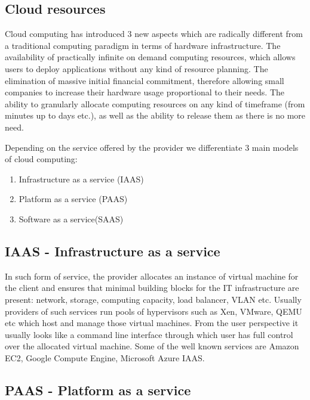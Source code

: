 \documentclass[licencjacka,en]{thesisclass}
\begin{document}
        \subsection{Cloud resources}

        Cloud computing has introduced 3 new aspects which are radically different from a traditional
        computing paradigm in terms of hardware infrastructure. 
        The availability of practically infinite on demand computing resources,
        which allows users to deploy applications without any kind of resource planning.  
        The elimination of massive initial financial commitment, therefore allowing small companies to increase
        their hardware usage proportional to their needs.
        The ability to granularly allocate computing resources on any kind of timeframe
        (from minutes up to days etc.), as well as the ability to release them as there is no more need.

        Depending on the service offered by the provider we differentiate 3 main models of cloud computing:

        \begin{enumerate}
            \item Infrastructure as a service (IAAS)
            \item Platform as a service (PAAS)
            \item Software as a service(SAAS)
        \end{enumerate}

        \subsection{IAAS - Infrastructure as a service}

        In such form of service, the provider allocates an instance of virtual machine for the client 
        and ensures that minimal building blocks for the IT infrastructure are present:
        network, storage, computing capacity, load balancer, VLAN etc.
        Usually providers of such services run pools of hypervisors such as Xen, VMware, QEMU etc which host and manage
        those virtual machines. From the user perspective it usually looks like a command line interface
        through which user has full control over the allocated virtual machine. Some of the well known
        services are Amazon EC2, Google Compute Engine, Microsoft Azure IAAS.

        \subsection{PAAS - Platform as a service}
\end{document}
